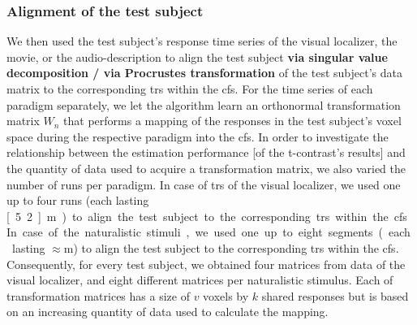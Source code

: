 


\subsubsection{Alignment of the test subject}






%
We then used the test subject's response time series of the visual localizer,
the movie, or the audio-description to align the test subject \textbf{via
singular value decomposition / via Procrustes transformation} of the test
subject's data matrix to the corresponding \acp{tr} within the \ac{cfs}.
%
For the time series of each paradigm separately, we let the algorithm learn
an orthonormal transformation matrix $W_{n}$ that performs a mapping of the
responses in the test subject's voxel space during the respective paradigm into
the \ac{cfs}.
%
In order to investigate the relationship between the estimation performance [of
the t-contrast's results] and the quantity of data used to acquire a
transformation matrix, we also varied the number of runs per paradigm.
%
In case of \acp{tr} of the visual localizer, we used one up to four runs (each
lasting \unit[5.2]{m}) to align the test subject to the corresponding \acp{tr}
within the \ac{cfs}.
%
In case of the naturalistic stimuli, we used one up to eight segments (each
lasting $\approx$\unit[15]{m}) to align the test subject to the corresponding
\acp{tr} within the \ac{cfs}.
%
Consequently, for every test subject, we obtained four matrices from data of the
visual localizer, and eight different matrices per naturalistic stimulus.
%
Each of transformation matrices has a size of $v$ voxels by $k$ shared responses
but is based on an increasing quantity of data used to calculate the mapping.


